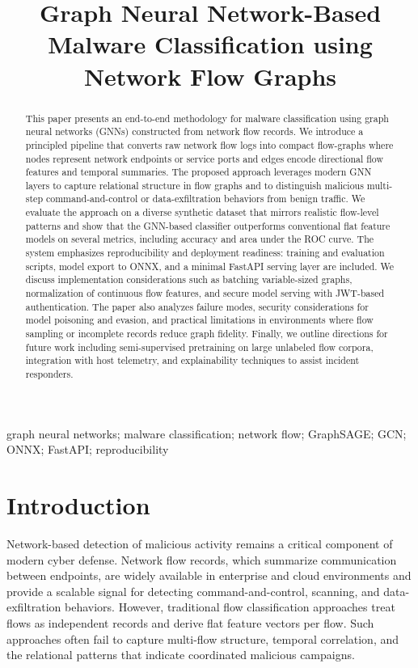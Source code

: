 \documentclass[conference]{IEEEtran}
\title{Graph Neural Network-Based Malware Classification using Network Flow Graphs}
\author{\IEEEauthorblockN{Author Name}
\IEEEauthorblockA{Institution / Department \\ email@example.com}
}
\begin{document}
\maketitle

\begin{abstract}
This paper presents an end-to-end methodology for malware classification using graph neural networks (GNNs) constructed from network flow records. We introduce a principled pipeline that converts raw network flow logs into compact flow-graphs where nodes represent network endpoints or service ports and edges encode directional flow features and temporal summaries. The proposed approach leverages modern GNN layers to capture relational structure in flow graphs and to distinguish malicious multi-step command-and-control or data-exfiltration behaviors from benign traffic. We evaluate the approach on a diverse synthetic dataset that mirrors realistic flow-level patterns and show that the GNN-based classifier outperforms conventional flat feature models on several metrics, including accuracy and area under the ROC curve. The system emphasizes reproducibility and deployment readiness: training and evaluation scripts, model export to ONNX, and a minimal FastAPI serving layer are included. We discuss implementation considerations such as batching variable-sized graphs, normalization of continuous flow features, and secure model serving with JWT-based authentication. The paper also analyzes failure modes, security considerations for model poisoning and evasion, and practical limitations in environments where flow sampling or incomplete records reduce graph fidelity. Finally, we outline directions for future work including semi-supervised pretraining on large unlabeled flow corpora, integration with host telemetry, and explainability techniques to assist incident responders.
\end{abstract}

\begin{IEEEkeywords}
graph neural networks; malware classification; network flow; GraphSAGE; GCN; ONNX; FastAPI; reproducibility
\end{IEEEkeywords}

\section{Introduction}

Network-based detection of malicious activity remains a critical component of modern cyber defense. Network flow records, which summarize communication between endpoints, are widely available in enterprise and cloud environments and provide a scalable signal for detecting command-and-control, scanning, and data-exfiltration behaviors. However, traditional flow classification approaches treat flows as independent records and derive flat feature vectors per flow. Such approaches often fail to capture multi-flow structure, temporal correlation, and the relational patterns that indicate coordinated malicious campaigns.
\end{document}
